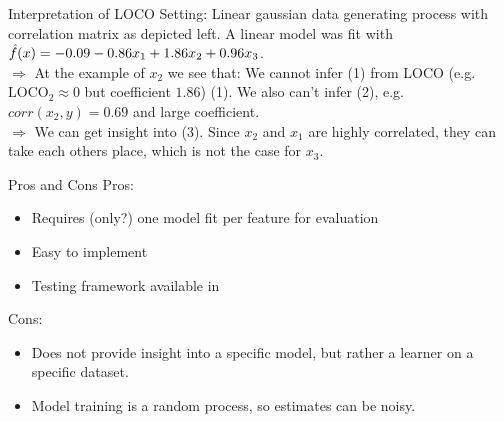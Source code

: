 \documentclass[11pt,compress,t,notes=noshow, xcolor=table]{beamer}
\begin{document}
\begin{vbframe}{Interpretation of LOCO}
Setting: Linear gaussian data generating process with correlation matrix as depicted left. A linear model was fit with $\fh(x) = -0.09 - 0.86 x_1 + 1.86 x_2 + 0.96 x_3$.\\
\lz
$\Rightarrow$ At the example of $x_2$ we see that: We cannot infer (1) from LOCO (e.g. $\text{LOCO}_2 \approx 0$ but coefficient $1.86$) (1). We also can't infer (2), e.g. $corr(x_2, y) = 0.69$ and large coefficient.\\
$\Rightarrow$ We can get insight into (3). Since $x_2$ and $x_1$ are highly correlated, they can take each others place, which is not the case for $x_3$.
\framebreak


\end{vbframe}

\begin{vbframe}{Pros and Cons}
  Pros:
  \begin{itemize}
    \item Requires (only?) one model fit per feature for evaluation
    \item Easy to implement
    \item Testing framework available in \cite{lei_distribution-free_2018}
  \end{itemize}
%
  Cons:
  \begin{itemize}
    \item Does not provide insight into a specific model, but rather a learner on a specific dataset.
    \item Model training is a random process, so estimates can be noisy.
  \end{itemize}
\end{vbframe}

\begin{vbframe}
  \printbibliography
\end{vbframe}

\endlecture
\end{document}
